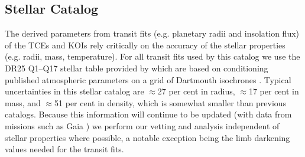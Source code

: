 \subsection{Stellar Catalog}
The derived parameters from transit fits (e.g. planetary radii and insolation flux) of the TCEs and KOIs rely critically on the accuracy of the stellar properties (e.g. radii, mass, temperature).   For all transit fits used by this catalog we use the DR25 Q1--Q17 stellar table provided by \citet{Mathur2017} which are based on conditioning published atmospheric parameters on a grid of Dartmouth isochrones \citet{Dotter2008}.  Typical uncertainties in this stellar catalog are $\approx$27 per cent in radius, $\approx$17 per cent in mass, and $\approx$51 per cent in density, which is somewhat smaller than previous catalogs. Because this information will continue to be updated (with data from missions such as Gaia \citep{Gaia2016}) we perform our vetting and analysis independent of stellar properties where possible, a notable exception being the limb darkening values needed for the transit fits.